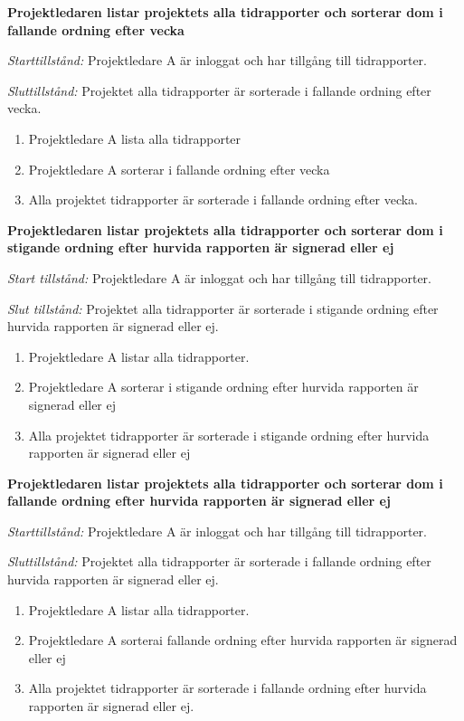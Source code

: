 \documentclass[a4paper]{article}
\begin{document}
\begin{FT}

\item %
\textbf{Projektledaren listar projektets alla tidrapporter och sorterar dom i fallande ordning efter vecka} 

\emph{Starttillstånd:} Projektledare A är inloggat och har tillgång till tidrapporter.

\emph{Sluttillstånd:} Projektet alla tidrapporter är sorterade i fallande ordning efter vecka.

\begin{enumerate}
\item Projektledare A lista alla tidrapporter
\item Projektledare A sorterar i fallande ordning efter vecka
\item Alla projektet tidrapporter är sorterade i fallande ordning efter vecka.
\end{enumerate}

\item %
\textbf{Projektledaren listar projektets alla tidrapporter och sorterar dom i stigande ordning efter hurvida rapporten är signerad eller ej}

\emph{Start tillstånd:} Projektledare A är inloggat och har tillgång till tidrapporter.

\emph{Slut tillstånd:} Projektet alla tidrapporter är sorterade i stigande ordning efter hurvida rapporten är signerad eller ej.

\begin{enumerate}
\item Projektledare A listar alla tidrapporter.
\item Projektledare A sorterar i stigande ordning efter hurvida rapporten är signerad eller ej
\item Alla projektet tidrapporter är sorterade i stigande ordning efter hurvida rapporten är signerad eller ej
\end{enumerate}

\item %
\textbf{Projektledaren listar projektets alla tidrapporter och sorterar dom i fallande ordning efter hurvida rapporten är signerad eller ej}

\emph{Starttillstånd:} Projektledare A är inloggat och har tillgång till tidrapporter.

\emph{Sluttillstånd:} Projektet alla tidrapporter är sorterade i fallande ordning efter hurvida rapporten är signerad eller ej.

\begin{enumerate}
\item Projektledare A listar alla tidrapporter.
\item Projektledare A sorterai fallande ordning efter hurvida rapporten är signerad eller ej
\item Alla projektet tidrapporter är sorterade i fallande ordning efter hurvida rapporten är signerad eller ej.
\end{enumerate}

\end{FT}
\end{document}
